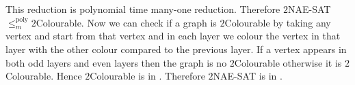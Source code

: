 \documentclass[a4paper, 11pt]{article}
\begin{document}
{\begin{enumerate}[label=(\alph*)]
 This reduction is polynomial time many-one reduction. Therefore $2$NAE-SAT$\leq_m^{\text{poly}}2$Colourable. Now we can check if a graph is $2$Colourable by taking any vertex and start  from that vertex and in each layer we colour the vertex in that layer with the other colour compared to the previous layer. If a vertex appears in both odd layers and even layers then the graph is no $2$Colourable otherwise it is $2$Colourable. Hence $2$Colourable is in \sfP. Therefore $2$NAE-SAT is in \sfP.
\end{enumerate}
}
\newpage
\end{document}
